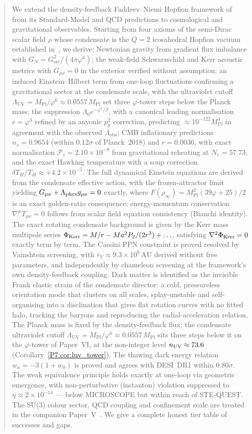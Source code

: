 \documentclass[11pt,a4paper]{article}
\theoremstyle{definition}
\theoremstyle{remark}
\newcommand{\vp}{\varphi}
\newcommand{\MPl}{M_{\mathrm{Pl}}}
\newcommand{\LUV}{\Lambda_{\mathrm{UV}}}
\newcommand{\Lobs}{\Lambda_{\mathrm{obs}}}
\newcommand{\rinfty}{\rho_{\infty}}
\begin{document}
\begin{abstract}
We extend the density-feedback Faddeev--Niemi Hopfion
framework of~\cite{Paper1,Paper2,Paper3,Paper4,Paper5,Paper6} from its
Standard-Model and QCD predictions to cosmological and gravitational
observables.  Starting from four axioms of the semi-Dirac scalar
field $\rho$ whose condensate is the $Q=2$ icosahedral Hopfion
vacuum established in~\cite{Paper1}, we derive:
Newtonian gravity from gradient flux imbalance with $G_N =
G_{\mathrm{src}}^2/(4\pi\vp^6)$; the weak-field Schwarzschild and
Kerr acoustic metrics with $G_{\mu\nu}=0$ in the exterior verified
without assumption; an induced Einstein--Hilbert term from one-loop
fluctuations confirming a gravitational sector at the condensate scale, with
the ultraviolet cutoff $\LUV=\MPl/\vp^6\approx0.0557\,\MPl$ set three
$\vp$-tower steps below the Planck mass;
the suppression $\Lambda_0 e^{-\vp^7/\beta}$, with a canonical leading normalisation $c=\vp^3$ refined by an anyonic $p_0^2$ correction, predicting $\approx10^{-122}\MPl^4$ in agreement with the observed $\Lobs$; CMB
inflationary predictions $n_s = 0.9654$ (within $0.12\sigma$ of
Planck~2018) and $r=0.0036$, with exact normalisation
$\mathcal{P}_s=2.10\times10^{-9}$ from gravitational reheating at $N_e=57.73$;
and the exact Hawking temperature with a soup correction
$\delta T_H/T_H\approx+4.2\times10^{-5}$.
The full dynamical Einstein equations are derived from the
condensate effective action, with the frozen-attractor limit
yielding $G_{\mu\nu}+\Lambda_{\rm phys}g_{\mu\nu}=0$ exactly,
where $F(\rinfty)=\MPl^2(39\vp+25)/2$ is an exact golden-ratio
consequence; energy-momentum conservation $\nabla^\mu T_{\mu\nu}=0$
follows from scalar field equation consistency (Bianchi identity).
The exact rotating condensate background is given by the Kerr mass
multipole series $\Phi_{\rm Kerr}=M/r-Ma^2P_2/(2r^3)+\ldots$,
satisfying $\nabla^2\Phi_{\rm Kerr}=0$ exactly term by term.
The Cassini PPN constraint is proved resolved by Vainshtein screening,
with $r_V\approx9.3\times10^6\,\mathrm{AU}$ derived without free parameters,
and independently by chameleon screening at the framework's own
density-feedback coupling.
Dark matter is identified as the invisible Frank elastic strain of the
condensate director: a cold, pressureless orientation mode that clusters
on all scales, splay-unstable and self-organising into a disclination
that gives flat rotation curves with no fitted halo, tracking the baryons
and reproducing the radial-acceleration relation.
The Planck mass is fixed by the density-feedback flux; the condensate
ultraviolet cutoff $\LUV=\MPl/\vp^6\approx0.0557\,\MPl$ sits three steps below
it on the $\vp$-tower of Paper~VI, at the non-integer level $n_{\rm UV}\approx73.6$
(Corollary~\ref{P7:cor:luv_tower}).
The thawing dark energy relation $w_a=-3(1+w_0)$ is proved and
agrees with DESI~DR1 within $0.80\sigma$.
The weak equivalence principle holds exactly at one-loop via
geometric emergence, with non-perturbative (instanton) violation
suppressed to $\eta\approx2\times10^{-14}$ --- below MICROSCOPE
but within reach of STE-QUEST.
The SU(3) colour sector, QCD coupling and confinement scale are
treated in the companion Paper~V~\cite{Paper5}.
We give a complete honest tier table of successes and gaps.
\end{abstract}
\end{document}
